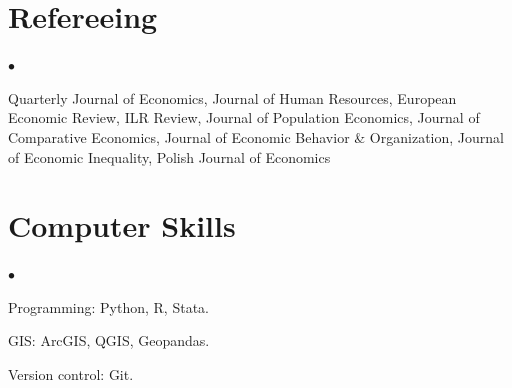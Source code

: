 \documentclass[margin,line]{res}
\newenvironment{list2}{
  \begin{list}{$\bullet$}{%
      \setlength{\itemsep}{0in}
      \setlength{\parsep}{0in} \setlength{\parskip}{0in}
      \setlength{\topsep}{0in} \setlength{\partopsep}{0in} 
      \setlength{\leftmargin}{0.2in}}}{\end{list}}
\begin{document}
\begin{resume}
\section{\sc Refereeing} 
\begin{list2}
	\item Quarterly Journal of Economics, Journal of Human Resources, European Economic Review, ILR Review, Journal of Population Economics, Journal of Comparative Economics, Journal of Economic Behavior \& Organization, Journal of Economic Inequality, Polish Journal of Economics  
\end{list2}
\vspace*{.05in} 
\section{\sc Computer Skills} 
\begin{list2}
\item Programming: Python, R, Stata.
\item GIS:  ArcGIS, QGIS, Geopandas.
\item Version control: Git.\\ 
\end{list2}



\end{resume}
\end{document}
